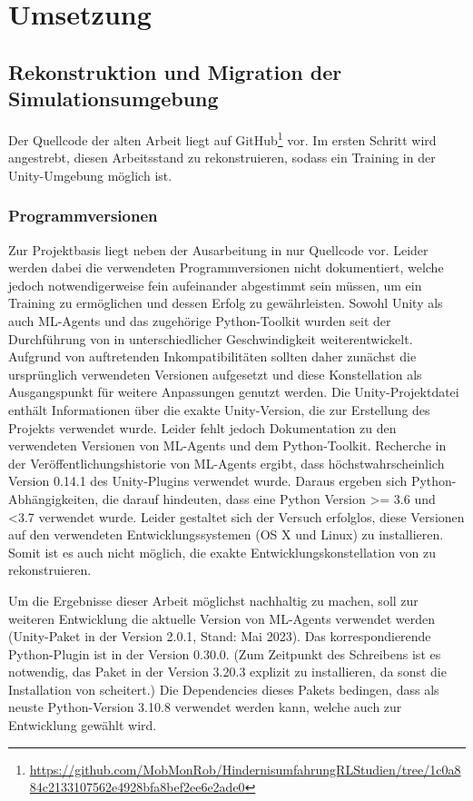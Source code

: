 \chapter{Umsetzung}
\section{Rekonstruktion und Migration der Simulationsumgebung}
Der Quellcode der alten Arbeit liegt auf GitHub\footnote{\url{https://github.com/MobMonRob/HindernisumfahrungRLStudien/tree/1c0a884c2133107562e4928bfa8bef2ee6e2ade0}} vor.
Im ersten Schritt wird angestrebt, diesen Arbeitsstand zu rekonstruieren, sodass ein Training in der Unity-Umgebung möglich ist.

\subsection{Programmversionen}
Zur Projektbasis liegt neben der Ausarbeitung in \cite{waidner.2020} nur Quellcode vor.
Leider werden dabei die verwendeten Programmversionen nicht dokumentiert, welche jedoch notwendigerweise fein aufeinander abgestimmt sein müssen, um ein Training zu ermöglichen und dessen Erfolg zu gewährleisten.
Sowohl Unity als auch ML-Agents und das zugehörige Python-Toolkit wurden seit der Durchführung von \cite{waidner.2020} in unterschiedlicher Geschwindigkeit weiterentwickelt.
Aufgrund von auftretenden Inkompatibilitäten sollten daher zunächst die ursprünglich verwendeten Versionen aufgesetzt und diese Konstellation als Ausgangspunkt für weitere Anpassungen genutzt werden.
Die Unity-Projektdatei enthält Informationen über die exakte Unity-Version, die zur Erstellung des Projekts verwendet wurde.
Leider fehlt jedoch Dokumentation zu den verwendeten Versionen von ML-Agents und dem Python-Toolkit.
Recherche in der Veröffentlichungshistorie von ML-Agents ergibt, dass höchstwahrscheinlich Version 0.14.1 des Unity-Plugins verwendet wurde.
Daraus ergeben sich Python-Abhängigkeiten, die darauf hindeuten, dass eine Python Version \textgreater= 3.6 und \textless 3.7 verwendet wurde.
Leider gestaltet sich der Versuch erfolglos, diese Versionen auf den verwendeten Entwicklungssystemen (OS X und Linux) zu installieren.
Somit ist es auch nicht möglich, die exakte Entwicklungskonstellation von \cite{waidner.2020} zu rekonstruieren.

Um die Ergebnisse dieser Arbeit möglichst nachhaltig zu machen, soll zur weiteren Entwicklung die aktuelle Version von ML-Agents verwendet werden (Unity-Paket in der Version 2.0.1, Stand: Mai 2023).
Das korrespondierende Python-Plugin ist  in der Version 0.30.0.
(Zum Zeitpunkt des Schreibens ist es notwendig, das Paket  in der Version 3.20.3 explizit zu installieren, da sonst die Installation von  scheitert.)
Die Dependencies dieses Pakets bedingen, dass als neuste Python-Version 3.10.8 verwendet werden kann, welche auch zur Entwicklung gewählt wird.

